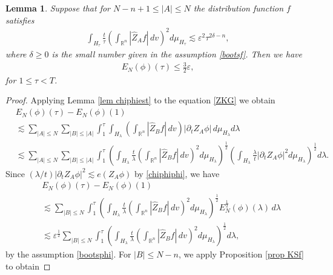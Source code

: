 \documentclass{article}
\newtheorem{lemma}{Lemma}[section]
\newcommand{\bbr}{{\mathbb R}}
\newcommand{\bbrn}{{\bbr^n}}
\begin{document}
%
\begin{lemma} \label{lem improvephi}
Suppose that for $ N - n + 1 \leq | A | \leq N $ the distribution function $ f $ satisfies
\begin{align}
\int_{ H_\tau } \frac{ t }{ \tau } \left( \int_\bbrn | \hat{ Z }_A f | \, d v \right)^2 d \mu_{ H_\tau } \lesssim \varepsilon^2 \tau^{ 2 \delta - n } , \label{L2}
\end{align}
where $ \delta \geq 0 $ is the small number given in the assumption \eqref{bootsf}. Then we have
\begin{align}
E_N ( \phi ) ( \tau ) \leq \frac32 \varepsilon , \label{improvephi}
\end{align}
for $ 1 \leq \tau < T $.
\end{lemma}
\begin{proof}
Applying Lemma \ref{lem chiphiest} to the equation \eqref{ZKG} we obtain
\begin{align*}
& E_N ( \phi ) ( \tau ) - E_N ( \phi ) ( 1 ) \\
& \lesssim \sum_{ | A | \leq N } \sum_{ | B | \leq | A | } \int_1^\tau \int_{ H_\lambda } \left( \int_\bbrn | \hat{ Z }_B f | \, d v \right) \left| \partial_t Z_A \phi \right| \, d \mu_{ H_\lambda } d \lambda \\
& \lesssim \sum_{ | A | \leq N } \sum_{ | B | \leq | A | } \int_1^\tau \left( \int_{ H_\lambda } \frac{ t }{ \lambda } \left( \int_\bbrn | \hat{ Z }_B f | \, d v \right)^2 d \mu_{ H_\lambda } \right)^{ \frac12 } \left( \int_{ H_\lambda } \frac{ \lambda }{ t } | \partial_t Z_A \phi |^2 d \mu_{ H_\lambda } \right)^{ \frac12 } d \lambda .
\end{align*}
Since $ ( \lambda / t ) | \partial_t Z_A \phi |^2 \lesssim e ( Z_A \phi ) $ by \eqref{chiphiphi}, we have
\begin{align*}
& E_N ( \phi ) ( \tau ) - E_N ( \phi ) ( 1 ) \\
& \lesssim \sum_{ | B | \leq N } \int_1^\tau \left( \int_{ H_\lambda } \frac{ t }{ \lambda } \left( \int_\bbrn | \hat{ Z }_B f | \, d v \right)^2 d \mu_{ H_\lambda } \right)^{ \frac12 } E_N^{ \frac12 } ( \phi ) ( \lambda ) \, d \lambda \\
& \lesssim \varepsilon^\frac12 \sum_{ | B | \leq N } \int_1^\tau \left( \int_{ H_\lambda } \frac{ t }{ \lambda } \left( \int_\bbrn | \hat{ Z }_B f | \, d v \right)^2 d \mu_{ H_\lambda } \right)^\frac12 d \lambda ,
\end{align*}
by the assumption \eqref{bootsphi}. For $ | B | \leq N - n $, we apply Proposition \ref{prop KSf} to obtain

\end{proof}
\end{document}
